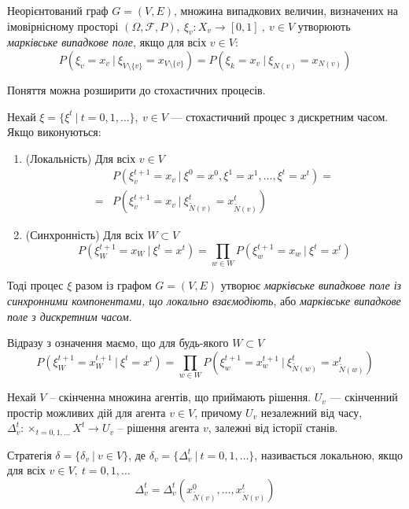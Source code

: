 \documentclass[oneside,14pt]{extarticle}
\begin{document}
\begin{definition}
Неорієнтований граф \(G = (V, E)\), множина випадкових величин, визначених на імовірнісному просторі \((\Omega, \mathcal{F}, P),\ \xi_v : X_v \rightarrow [0, 1]\ ,\ v \in V\) утворюють \textit{марківське випадкове поле}, якщо для всіх \(v \in V\):
\[P(\xi_v = x_v\ |\ \xi_{V\setminus\{v\}} = x_{V\setminus\{v\}}) = P(\xi_k = x_v\ |\ \xi_{N(v)} = x_{N(v)})\]
\end{definition}

Поняття можна розширити до стохастичних процесів.
\begin{definition}
\label{def:mrftime}
Нехай \(\xi = \{\xi^t\ |\ t=0,1,\ldots\},\ v \in V \) — стохастичний процес з дискретним часом. 
Якщо виконуються:

\begin{enumerate}
    \item (Локальність) Для всіх \(v \in V\)
    \begin{align*}
    &P(\xi_v^{t+1} = x_v\ |\ \xi^0 = x^0, \xi^1 = x^1, \ldots, \xi^t = x^t) = \\
    = &P(\xi_v^{t+1} = x_v\ |\ \xi_{\tilde N(v)}^t = x_{\tilde N(v)}^t )
    \end{align*}
    \item (Синхронність) Для всіх \(W \subset V\) \[P(\xi^{t+1}_W = x_W\ |\ \xi^t = x^t) = \prod_{w \in W} P(\xi^{t+1}_w = x_w\ |\ \xi^t = x^t) \]
\end{enumerate}

Тоді процес \(\xi\) разом із графом \(G = (V, E)\) утворює \textit{марківське випадкове поле із синхронними компонентами, що локально взаємодіють}, або \textit{марківське випадкове поле з дискретним часом}. 
\end{definition}

Відразу з означення маємо, що для будь-якого \(W \subset V\)
\[P(\xi_W^{t+1} = x_W^{t+1}\ |\ \xi^t = x^t) = \prod_{w \in W} P(\xi_w^{t+1} = x_w^{t+1}\ |\ \xi_{\tilde{N}(w)}^t = x_{\tilde{N}(w)}^t)\]

Нехай \(V\) – скінченна множина агентів, що приймають рішення. \(U_v\) — скінченний простір можливих дій для агента \(v \in V\), причому \(U_v\) незалежний від часу, \(\Delta_v^t: \times_{t=0,1,\ldots}X^t \rightarrow U_v\) – рішення агента \(v\), залежні від історії станів. 

\begin{definition}
Стратегія \(\delta = \{\delta_v\ |\ v \in V\}\), де \(\delta_v = \{\Delta_v^t\ |\ t=0,1,\ldots\}\), називається локальною, якщо для всіх \(v \in V,\ t = 0, 1, \ldots\)
\[\Delta_v^t = \Delta_v^t(x_{\tilde{N}(v)}^0, \ldots, x_{\tilde{N}(v)}^t)\]
\end{definition}
\end{document}
